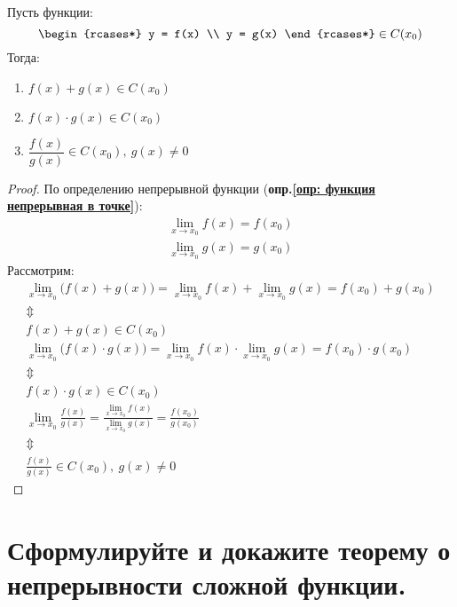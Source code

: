 \begin{theorem}
  Пусть функции: \[
    \begin{rcases*}
      y = f(x) \\
      y = g(x)
    \end{rcases*}
    \in C(x_0) \]
  Тогда:
  \begin{enumerate}
    \item $f(x) + g(x) \in C(x_0)$
    \item $f(x) \cdot g(x) \in C(x_0)$
    \item $\dfrac{f(x)}{g(x)} \in C(x_0),\ g(x) \ne 0$
  \end{enumerate}
\end{theorem}
\begin{proof}
  По определению непрерывной функции (\textbf{опр.\ref{опр: функция непрерывная в точке}}): 
  \begin{gather*} 
    \lim_{x \to x_0} f(x) = f(x_0) \\
    \lim_{x \to x_0} g(x) = g(x_0) 
  \end{gather*}
  Рассмотрим: 
  \begin{gather*}
    \lim_{x \to x_0} \big(f(x) + g(x)\big) = \lim_{x \to x_0} f(x) + \lim_{x \to x_0} g(x) = f(x_0) + g(x_0) \tag{1}\\
    \Updownarrow \\
    f(x) + g(x) \in C(x_0) \\[2ex]
    \lim_{x \to x_0} \big(f(x) \cdot g(x)\big) = \lim_{x \to x_0} f(x) \cdot \lim_{x \to x_0} g(x) = f(x_0) \cdot g(x_0) \tag{2} \\
    \Updownarrow \\
    f(x) \cdot g(x) \in C(x_0) \\[2ex]
    \lim_{x \to x_0} \frac{f(x)}{g(x)} = \frac{\lim\limits_{x \to x_0} f(x)}{\lim\limits_{x \to x_0} g(x)} = \frac{f(x_0)}{g(x_0)} \tag{3} \\
    \Updownarrow \\
    \frac{f(x)}{g(x)} \in C(x_0),\ g(x) \ne 0
  \end{gather*}
\end{proof}

\section{Сформулируйте и докажите теорему о непрерывности сложной функции.}

